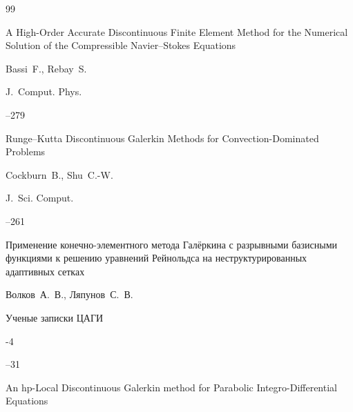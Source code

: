 \begin{thebibliography}{99}






\paper A High-Order Accurate Discontinuous Finite Element Method for the Numerical Solution of the Compressible Navier–Stokes Equations

\by Bassi~F., Rebay~S.

\jour  J.~Comput. Phys.




--279







\paper Runge–Kutta Discontinuous Galerkin Methods for Convection-Dominated Problems

\by Cockburn~B., Shu~C.-W.

\jour J.~Sci. Comput.




--261





\paper Применение конечно-элементного метода Галёркина с разрывными базисными функциями к решению уравнений Рейнольдса на неструктурированных адаптивных сетках

\by Волков~А.~В., Ляпунов~С.~В.

\jour Ученые записки ЦАГИ



-4

--31








\paper An hp-Local Discontinuous Galerkin method for Parabolic Integro-Differential Equations


\end{thebibliography}
